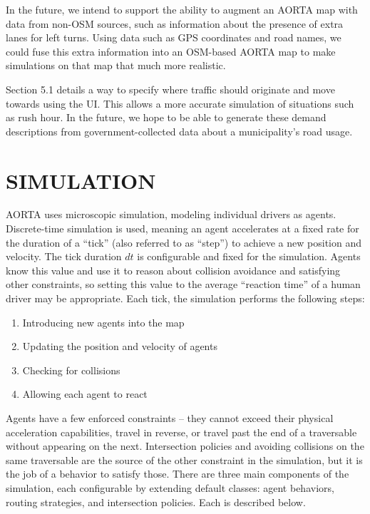 \documentclass[letterpaper, 10 pt, conference]{ieeeconf}  %
\begin{document}

In the future, we intend to support the ability to augment an AORTA map with
data from non-OSM sources, such as information about the presence of extra lanes
for left turns. Using data such as GPS coordinates and road names, we could fuse
this extra information into an OSM-based AORTA map to make simulations on that map
that much more realistic.

Section 5.1 details a way to specify where traffic should originate and move
towards using the UI. This allows a more accurate simulation of situations such
as rush hour. In the future, we hope to be able to generate these demand
descriptions from government-collected data about a municipality's road usage.


\section{SIMULATION}

AORTA uses microscopic simulation, modeling individual drivers as agents.
Discrete-time simulation is used, meaning an agent accelerates at a fixed rate
for the duration of a ``tick'' (also referred to as ``step'') to achieve a new
position and velocity. The tick duration $dt$ is configurable and fixed
 for the simulation.
Agents know this value and use it to reason about collision avoidance and
satisfying other constraints, so setting this value to the average ``reaction
time'' of a human driver may be appropriate. Each tick, the simulation performs
the following steps:

\begin{enumerate}
  \item Introducing new agents into the map
  \item Updating the position and velocity of agents
  \item Checking for collisions
  \item Allowing each agent to react
\end{enumerate}

Agents have a few enforced constraints -- they cannot exceed their physical
acceleration capabilities, travel in reverse, or travel past the end of a
traversable without appearing on the next. Intersection policies and avoiding
collisions on the same traversable are the source of the other constraint in the
simulation, but it is the job of a behavior to satisfy those. There are three
main components of the simulation, each configurable by extending default
classes: agent behaviors, routing strategies, and intersection policies. Each
is described below.
\end{document}
